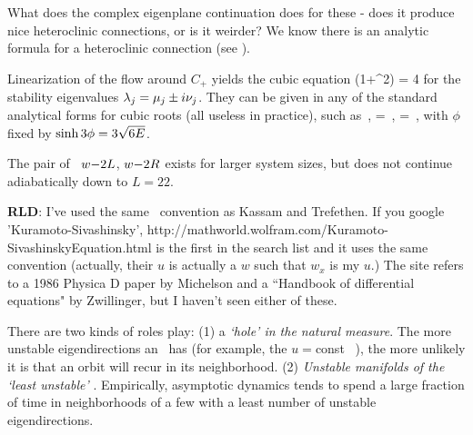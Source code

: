 {What does the complex eigenplane continuation does for these
{\eqva} - does it produce nice heteroclinic connections, or is it
weirder? We know there is an analytic formula for a heteroclinic
connection (see ). %

Linearization of the flow around $C_{+}$ yields the cubic equation
  \beq
\eigExp(1+\eigExp^2) = 4 \expctE
for the
stability eigenvalues
$\eigExp[j] = \eigRe[j] \pm i \eigIm[j]$.
They can
be given in any of the standard analytical forms for cubic
roots  (all useless in practice), such as
    \,,\qquad
\eigRe=\sinh \phi
\,,\qquad
\eigIm=\cosh \phi \, ,
with $\phi$ fixed by $\sinh 3\phi=3\sqrt{6\expctE}$.

The pair of \reqva\
${\nameit}2L$,
${\nameit}2R$
exists for larger system sizes, but does not continue
adiabatically down to $L=22$.



{\bf RLD}:
I've used the same \KSe\ convention as Kassam and Trefethen.
If you google 'Kuramoto-Sivashinsky',
http://mathworld.wolfram.com/Kuramoto-SivashinskyEquation.html is
the first in the search list and it uses the same convention
(actually, their $u$ is actually a $w$ such that $w_x$ is my $u$.)
The site refers to a 1986 Physica D paper by Michelson and a
``Handbook of differential equations" by Zwillinger, but I haven't
seen either of these.

%
There are two kinds of roles
{\eqva} play:
(1)
a {\em `hole' in the natural measure}.
The more unstable eigendirections an \eqv\ has (for example, the
$u=$const \eqv~\EQV{0}), the more unlikely it is  that
an orbit will recur in its neighborhood.
(2)
{\em Unstable manifolds of the `least unstable' {\eqva}}.
Empirically, asymptotic dynamics tends to spend
a large fraction of time in
neighborhoods of a few  {\eqva} with
a least number of unstable eigendirections.




}

